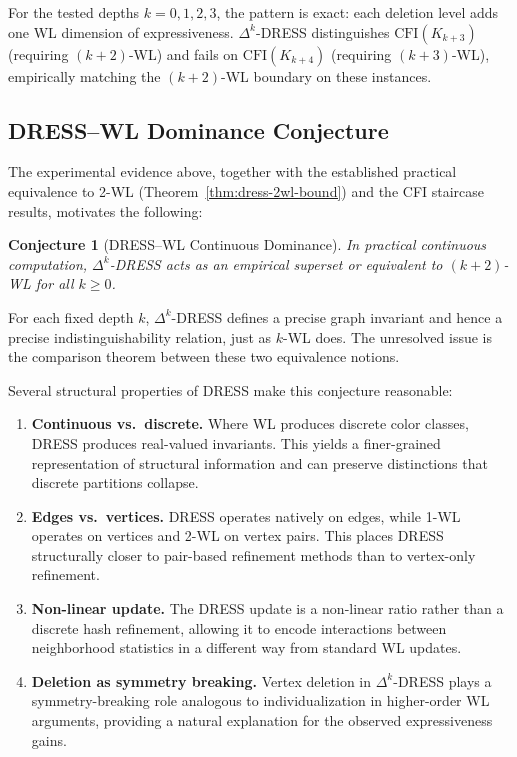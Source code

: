 \documentclass[11pt,a4paper]{article}
\newtheorem{conjecture}[theorem]{Conjecture}
\begin{document}
For the tested depths $k = 0,1,2,3$, the pattern is exact: each deletion level adds one WL dimension of expressiveness. $\Delta^k$-DRESS distinguishes $\text{CFI}(K_{k+3})$ (requiring $(k{+}2)$-WL) and fails on $\text{CFI}(K_{k+4})$ (requiring $(k{+}3)$-WL), empirically matching the $(k{+}2)$-WL boundary on these instances.

\subsection{DRESS--WL Dominance Conjecture}

The experimental evidence above, together with the established practical equivalence to 2-WL (Theorem~\ref{thm:dress-2wl-bound}) and the CFI staircase results, motivates the following:

\begin{conjecture}[DRESS--WL Continuous Dominance]
\label{conj:dress-wl}
In practical continuous computation, $\Delta^k$-DRESS acts as an empirical superset or equivalent to $(k+2)$-WL for all $k \geq 0$.
\end{conjecture}

For each fixed depth $k$, $\Delta^k$-DRESS defines a precise graph invariant and hence a precise indistinguishability relation, just as $k$-WL does. The unresolved issue is the comparison theorem between these two equivalence notions.

Several structural properties of DRESS make this conjecture reasonable:

\begin{enumerate}
    \item \textbf{Continuous vs.\ discrete.} Where WL produces discrete color classes, DRESS produces real-valued invariants. This yields a finer-grained representation of structural information and can preserve distinctions that discrete partitions collapse.
    \item \textbf{Edges vs.\ vertices.} DRESS operates natively on edges, while 1-WL operates on vertices and 2-WL on vertex pairs. This places DRESS structurally closer to pair-based refinement methods than to vertex-only refinement.
    \item \textbf{Non-linear update.} The DRESS update is a non-linear ratio rather than a discrete hash refinement, allowing it to encode interactions between neighborhood statistics in a different way from standard WL updates.
    \item \textbf{Deletion as symmetry breaking.} Vertex deletion in $\Delta^k$-DRESS plays a symmetry-breaking role analogous to individualization in higher-order WL arguments, providing a natural explanation for the observed expressiveness gains.
\end{enumerate}
\end{document}
